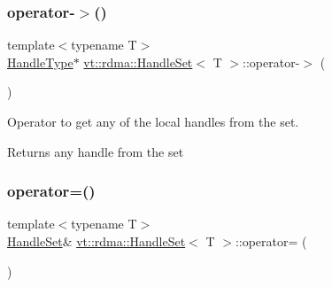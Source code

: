 \subsubsection{\texorpdfstring{operator-\/$>$()}{operator->()}}
{\footnotesize\ttfamily template$<$typename T$>$ \\
\hyperlink{structvt_1_1rdma_1_1_handle_set_ab3a698ee86bae503dfa84617205b2dd9}{Handle\+Type}$\ast$ \hyperlink{structvt_1_1rdma_1_1_handle_set}{vt\+::rdma\+::\+Handle\+Set}$<$ T $>$\+::operator-\/$>$ (\begin{DoxyParamCaption}{ }\end{DoxyParamCaption})\hspace{0.3cm}{\ttfamily [inline]}}



Operator to get any of the local handles from the set. 

\begin{DoxyReturn}{Returns}
any handle from the set 
\end{DoxyReturn}
\mbox{\label{structvt_1_1rdma_1_1_handle_set_a9bd23e3b2d2f5d4f7ad5b8dde06da2f8}} 
\subsubsection{\texorpdfstring{operator=()}{operator=()}\hspace{0.1cm}{\footnotesize\ttfamily [1/2]}}
{\footnotesize\ttfamily template$<$typename T$>$ \\
\hyperlink{structvt_1_1rdma_1_1_handle_set}{Handle\+Set}\& \hyperlink{structvt_1_1rdma_1_1_handle_set}{vt\+::rdma\+::\+Handle\+Set}$<$ T $>$\+::operator= (\begin{DoxyParamCaption}\item[{\hyperlink{structvt_1_1rdma_1_1_handle_set}{Handle\+Set}$<$ T $>$ const \&}]{ }\end{DoxyParamCaption})\hspace{0.3cm}{\ttfamily [default]}}

\mbox{\label{structvt_1_1rdma_1_1_handle_set_afbb15c0776ef7ace101025f2ae151ecd}} 
